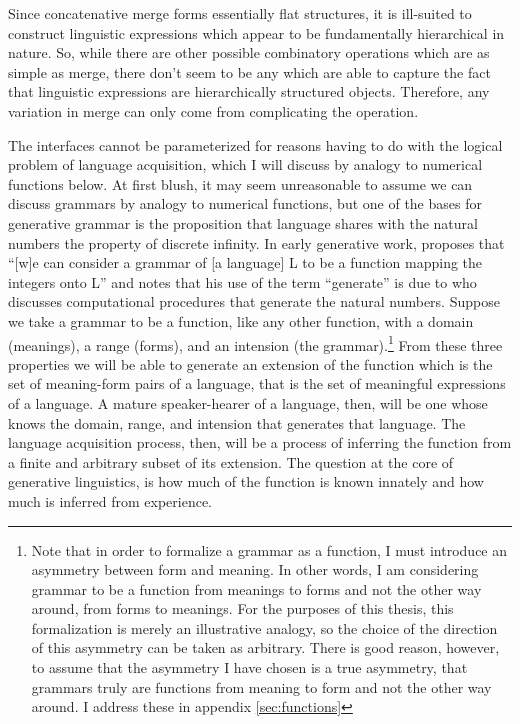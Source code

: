 \documentclass[MilwayThesis]{subfiles}
\begin{document}
Since concatenative merge forms essentially flat structures, it is ill-suited to construct linguistic expressions which appear to be fundamentally hierarchical in nature.
So, while there are other possible combinatory operations which are as simple as merge, there don't seem to be any which are able to capture the fact that linguistic expressions are hierarchically structured objects.
Therefore, any variation in merge can only come from complicating the operation.

The interfaces cannot be parameterized for reasons having to do with the logical problem of language acquisition, which I will discuss by analogy to numerical functions below.
At first blush, it may seem unreasonable to assume we can discuss grammars by analogy to numerical functions, but one of the bases for generative grammar is the proposition that language shares with the natural numbers the property of discrete infinity.
In early generative work, \textcite{chomsky1959certain} proposes that ``[w]e can consider a grammar of [a language] L to be a function mapping the integers onto L'' and notes that his use of the term ``generate'' is due to \textcite{post1944recursively} who discusses computational procedures that generate the natural numbers.
Suppose we take a grammar to be a function, like any other function, with a domain (meanings), a range (forms), and an intension (the grammar).\footnote{
	Note that in order to formalize a grammar as a function, I must introduce an asymmetry between form and meaning.
	In other words, I am considering grammar to be a function from meanings to forms and not the other way around, from forms to meanings.
	For the purposes of this thesis, this formalization is merely an illustrative analogy, so the choice of the direction of this asymmetry can be taken as arbitrary.
	There is good reason, however, to assume that the asymmetry I have chosen is a true asymmetry, that grammars truly are functions from meaning to form and not the other way around.
	I address these in appendix \ref{sec:functions}
}
From these three properties we will be able to generate an extension of the function which is the set of meaning-form pairs of a language, that is the set of meaningful expressions of a language.
A mature speaker-hearer of a language, then, will be one whose knows the domain, range, and intension that generates that language.
The language acquisition process, then, will be a process of inferring the function from a finite and arbitrary subset of its extension.
The question at the core of generative linguistics, is how much of the function is known innately and how much is inferred from experience.
\end{document}
